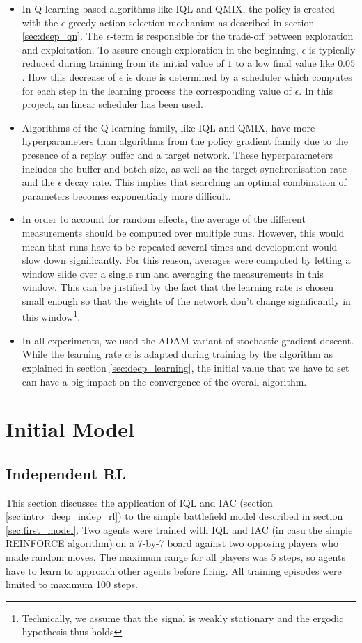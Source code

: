 \begin{itemize}
    \item In Q-learning based algorithms like IQL and QMIX, the policy is created with the $\epsilon$-greedy action selection mechanism as described in section \ref{sec:deep_qn}. The $\epsilon$-term is responsible for the trade-off between exploration and exploitation. To assure enough exploration in the beginning, $\epsilon$ is typically reduced during training from its initial value of $1$ to a low final value like $0.05$. How this decrease of $\epsilon$ is done is determined by a scheduler which computes for each step in the learning process the corresponding value of $\epsilon$. In this project, an linear scheduler has been used.
    \item Algorithms of the Q-learning family, like IQL and QMIX, have more hyperparameters than algorithms from the policy gradient family due to the presence of a replay buffer and a target network. These hyperparameters includes the buffer and batch size, as well as the target synchronisation rate and the $\epsilon$ decay rate. This implies that searching an optimal combination of parameters becomes exponentially more difficult.
    \item In order to account for random effects, the average of the different measurements should be computed over multiple runs. However, this would mean that runs have to be repeated several times and development would slow down significantly. For this reason, averages were computed by letting a window slide over a single run and averaging the measurements in this window. This can be justified by the fact that the learning rate is chosen small enough so that the weights of the network don't change significantly in this window\footnote{Technically, we assume that the signal is weakly stationary and the ergodic hypothesis thus holds}.
    \item In all experiments, we used the ADAM variant of stochastic gradient descent. While the learning rate $\alpha$ is adapted during training by the algorithm as explained in section \ref{sec:deep_learning}, the initial value that we have to set can have a big impact on the convergence of the overall algorithm.
\end{itemize}

\section{Initial Model}
\subsection{Independent RL} %
\label{sec:iql_applied}
This section discusses the application of IQL and IAC (section \ref{sec:intro_deep_indep_rl}) to the simple battlefield model described in section \ref{sec:first_model}. Two agents were trained with IQL and IAC (in casu the simple REINFORCE algorithm) on a 7-by-7 board against two opposing players who made random moves. The maximum range for all players was $5$ steps, so agents have to learn to approach other agents before firing. All training episodes were limited to maximum 100 steps.\\

